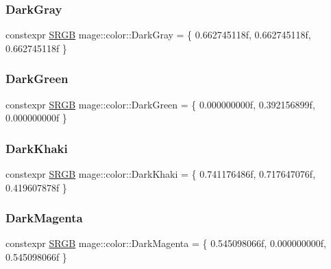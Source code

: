 \subsubsection{\texorpdfstring{Dark\+Gray}{DarkGray}}
{\footnotesize\ttfamily constexpr \hyperlink{structmage_1_1_s_r_g_b}{S\+R\+GB} mage\+::color\+::\+Dark\+Gray = \{ 0.\+662745118f, 0.\+662745118f, 0.\+662745118f \}}

\hypertarget{namespacemage_1_1color_a7a527173536e78422cd428ac7bf107e1}{}\label{namespacemage_1_1color_a7a527173536e78422cd428ac7bf107e1} 
\subsubsection{\texorpdfstring{Dark\+Green}{DarkGreen}}
{\footnotesize\ttfamily constexpr \hyperlink{structmage_1_1_s_r_g_b}{S\+R\+GB} mage\+::color\+::\+Dark\+Green = \{ 0.\+000000000f, 0.\+392156899f, 0.\+000000000f \}}

\hypertarget{namespacemage_1_1color_a622f8ca6870bfcf09bb211883b8a9beb}{}\label{namespacemage_1_1color_a622f8ca6870bfcf09bb211883b8a9beb} 
\subsubsection{\texorpdfstring{Dark\+Khaki}{DarkKhaki}}
{\footnotesize\ttfamily constexpr \hyperlink{structmage_1_1_s_r_g_b}{S\+R\+GB} mage\+::color\+::\+Dark\+Khaki = \{ 0.\+741176486f, 0.\+717647076f, 0.\+419607878f \}}

\hypertarget{namespacemage_1_1color_a6fa40a1e1b23a9b75e0a21090d1285d6}{}\label{namespacemage_1_1color_a6fa40a1e1b23a9b75e0a21090d1285d6} 
\subsubsection{\texorpdfstring{Dark\+Magenta}{DarkMagenta}}
{\footnotesize\ttfamily constexpr \hyperlink{structmage_1_1_s_r_g_b}{S\+R\+GB} mage\+::color\+::\+Dark\+Magenta = \{ 0.\+545098066f, 0.\+000000000f, 0.\+545098066f \}}

\hypertarget{namespacemage_1_1color_a6d920e13c613156ed78bda2431e88f1a}{}\label{namespacemage_1_1color_a6d920e13c613156ed78bda2431e88f1a} 
